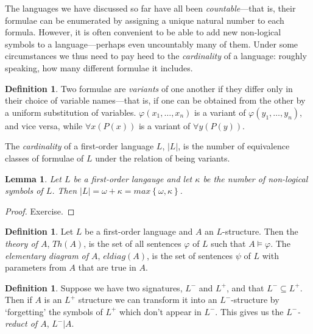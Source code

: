 \documentclass[10pt, a4paper, oneside]{article}
\theoremstyle{definition}
\newtheorem{dfn}[thm]{Definition}
\theoremstyle{remark}
\theoremstyle{plain}
\newtheorem{lem}[thm]{Lemma}
\theoremstyle{plain}
\begin{document}
The languages we have discussed so far have all been \emph{countable}---that is,
their formulae can be enumerated by assigning a unique natural number to each
formula. However, it is often convenient to be able to add new non-logical
symbols to a language---perhaps even uncountably many of them. Under some
circumstances we thus need to pay heed to the \emph{cardinality} of a language:
roughly speaking, how many different formulae it includes.

\begin{dfn}
    Two formulae are \emph{variants} of one another if they differ only in their
    choice of variable names---that is, if one can be obtained from the other by
    a uniform substitution of variables. $\varphi(x_1, \dotsc, x_n)$ is a
    variant of $\varphi(y_1, \dotsc, y_n)$, and vice versa, while
    $\forall{x} (P(x))$ is a variant of $\forall{y} (P(y))$.
    
    The \emph{cardinality} of a first-order language $L$, $|L|$, is the number
    of equivalence classes of formulae of $L$ under the relation of being
    variants.
\end{dfn}

\begin{lem}
    Let $L$ be a first-order langauge and let $\kappa$ be the number of
    non-logical symbols of $L$. Then $|L| = \omega + \kappa =
    max \left\{ \omega, \kappa \right\}$.
\end{lem}

\begin{proof}
    Exercise.
\end{proof}

\begin{dfn}
    Let $L$ be a first-order language and $A$ an $L$-structure. Then the
    \emph{theory of $A$}, $Th(A)$, is the set of all sentences $\varphi$ of $L$
    such that $A \models \varphi$. The \emph{elementary diagram of $A$},
    $eldiag(A)$, is the set of sentences $\psi$ of $L$ with parameters from $A$
    that are true in $A$.
\end{dfn}

\begin{dfn}
    Suppose we have two signatures, $L^-$ and $L^+$, and that $L^- \subseteq
    L^+$. Then if $A$ is an $L^+$ structure we can transform it into an
    $L^-$-structure by `forgetting' the symbols of $L^+$ which don't appear in
    $L^-$. This gives us the \emph{$L^-$-reduct of $A$}, $L^- | A$.
\end{dfn}
\end{document}
